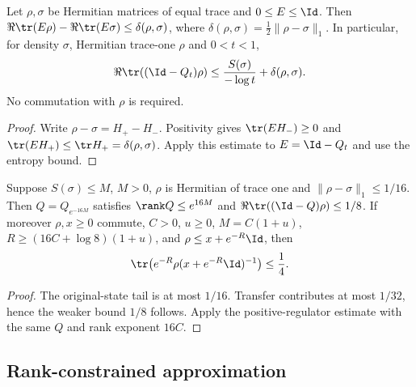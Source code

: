 \begin{theorem}
\label{thm:entropy_spectral_tail_transfer}
\leanok
Let $\rho,\sigma$ be Hermitian matrices of equal trace and $0\le E\le\Id$.
Then $\Re\tr(E\rho)-\Re\tr(E\sigma)\le\delta(\rho,\sigma)$, where
$\delta(\rho,\sigma)=\frac12\|\rho-\sigma\|_1$.
In particular, for density $\sigma$, Hermitian trace-one $\rho$ and $0<t<1$,
\begin{align}
 \Re\tr((\Id-Q_t)\rho)
 \le\frac{S(\sigma)}{-\log t}+\delta(\rho,\sigma).
\end{align}
No commutation with $\rho$ is required.
\end{theorem}
\begin{proof}
\leanok
{}
Write $\rho-\sigma=H_+-H_-$. Positivity gives
$\tr(EH_-)\ge0$ and $\tr(EH_+)\le\tr H_+=\delta(\rho,\sigma)$.
Apply this estimate to $E=\Id-Q_t$ and use the entropy bound.
\end{proof}

\begin{theorem}
\label{thm:entropy_spectral_tail_regulator}
\leanok
Suppose $S(\sigma)\le M$, $M>0$, $\rho$ is Hermitian of trace one and
$\|\rho-\sigma\|_1\le1/16$. Then $Q=Q_{e^{-16M}}$ satisfies
$\rank Q\le e^{16M}$ and $\Re\tr((\Id-Q)\rho)\le1/8$.
If moreover $\rho,x\ge0$ commute, $C>0$, $u\ge0$,
$M=C(1+u)$, $R\ge(16C+\log8)(1+u)$, and $\rho\le x+e^{-R}\Id$, then
\begin{align}
 \tr\bigl(e^{-R}\rho(x+e^{-R}\Id)^{-1}\bigr)\le\frac14.
\end{align}
\end{theorem}
\begin{proof}
\leanok
{}
The original-state tail is at most $1/16$. Transfer contributes at most
$1/32$, hence the weaker bound $1/8$ follows. Apply the positive-regulator
estimate with the same $Q$ and rank exponent $16C$.
\end{proof}

\subsection{Rank-constrained approximation}

